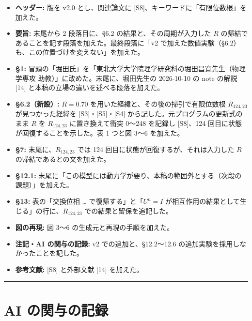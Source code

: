 \documentclass[
  a4paper,
]{ltjsarticle}
\providecommand{\tightlist}{%
  \setlength{\itemsep}{0pt}\setlength{\parskip}{0pt}}
\begin{document}
\begin{itemize}
\tightlist
\item
  \textbf{ヘッダー:} 版を v2.0 とし、関連論文に
  {[}S8{]}、キーワードに「有限位数根」を加えた。
\item
  \textbf{要旨:} 末尾から 2 段落目に、§6.2 の結果と、その周期が入力した
  \(R\) の帰結であることを記す段落を加えた。最終段落に「v2
  で加えた数値実験（§6.2）も、この位置づけを変えない」を加えた。
\item
  \textbf{§1:}
  冒頭の「堀田氏」を「東北大学大学院理学研究科の堀田昌寛先生（物理学専攻
  助教）」に改めた。末尾に、堀田先生の 2026-10-10 の note の解説
  {[}14{]} と本稿の立場の違いを述べる段落を加えた。
\item
  \textbf{§6.2（新設）:} \(R=0.70\)
  を用いた経緯と、その後の掃引で有限位数根 \(R_{124,23}\)
  が見つかった経緯を {[}S3{]}・{[}S5{]}・{[}S4{]}
  から記した。元プログラムの更新式のまま \(R\) を \(R_{124,23}\)
  に置き換えて衝突 0〜248 を記録し {[}S8{]}、124
  回目に状態が回復することを示した。表 1 つと図 3〜6 を加えた。
\item
  \textbf{§7:} 末尾に、\(R_{124,23}\) では 124
  回目に状態が回復するが、それは入力した \(R\)
  の帰結であるとの文を加えた。
\item
  \textbf{§12.1:}
  末尾に「この模型には動力学が要り、本稿の範囲外とする（次段の課題）」を加えた。
\item
  \textbf{§13:} 表の「交換位相 \ldots{} で復帰する」と「\(U^n=I\)
  が相互作用の結果として生じる」の行に、\(R_{124,23}\)
  での結果と留保を追記した。
\item
  \textbf{図の再現:} 図 3〜6 の生成元と再現の手順を加えた。
\item
  \textbf{注記・AI の関与の記録:} v2 での追加と、§12.2〜12.6
  の追加実験を採用しなかったことを記した。
\item
  \textbf{参考文献:} {[}S8{]} と外部文献 {[}14{]} を加えた。
\end{itemize}

\begin{center}\rule{0.5\linewidth}{0.5pt}\end{center}

\section{AI の関与の記録}\label{ai-ux306eux95a2ux4e0eux306eux8a18ux9332}
\end{document}
